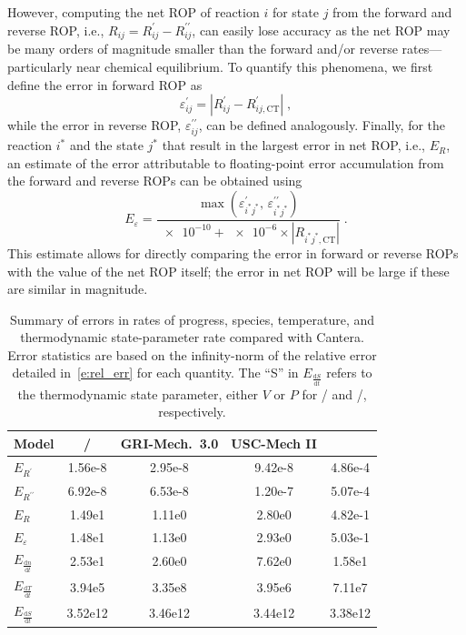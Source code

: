\documentclass[12pt,number,sort&compress,preprint]{elsarticle}
\begin{document}
However, computing the net ROP of reaction $i$ for state $j$ from the forward and reverse ROP, i.e., $R_{ij} = R_{ij}^{\prime} - R_{ij}^{\prime\prime}$, can easily lose accuracy as the net ROP may be many orders of magnitude smaller than the forward and\slash or reverse rates---particularly near chemical equilibrium.
To quantify this phenomena, we first define the error in forward ROP as
\begin{equation}
\varepsilon^{\prime}_{ij} = \left\lvert R_{ij}^{\prime} - R_{ij,\text{CT}}^{\prime} \right\rvert \;,
\end{equation}
while the error in reverse ROP, $\varepsilon^{\prime\prime}_{ij}$, can be defined analogously.
Finally, for the reaction $i^{*}$ and the state $j^{*}$ that result in the largest error in net ROP, i.e., $E_{R}$, an estimate of the error attributable to floating-point error accumulation from the forward and reverse ROPs can be obtained using
\begin{equation}
E_{\varepsilon} = \frac{\max(\varepsilon^{\prime}_{i^{*}j^{*}}\text{, }\varepsilon^{\prime\prime}_{i^{*}j^{*}})}{\num{e-10} + \num{e-6} \times \left\lvert R_{i^{*}j^{*},\text{CT}} \right\rvert} \;.
\end{equation}
This estimate allows for directly comparing the error in forward or reverse ROPs with the value of the net ROP itself; the error in net ROP will be large if these are similar in magnitude.

\begin{table}[htbp]
\centering
\begin{tabular}{@{}l S[table-format=1.2e1] S[table-format=1.2e1] S[table-format=1.2e1] S[table-format=1.2e1] @{}}
\toprule
{Model} & {\slash{}} & {GRI-Mech.~3.0} & {USC-Mech II} & {} \\
\midrule
$E_{R^{\prime}}$                    & 1.56e-8 & 2.95e-8 & 9.42e-8 & 4.86e-4 \\
$E_{R^{\prime\prime}}$              & 6.92e-8 & 6.53e-8 & 1.20e-7 & 5.07e-4 \\
$E_{R}$                             & 1.49e1  & 1.11e0  & 2.80e0  & 4.82e-1 \\
$E_{\varepsilon}$                   & 1.48e1  & 1.13e0  & 2.93e0  & 5.03e-1 \\
$E_{\frac{\text{d} n}{\text{d} t}}$ & 2.53e1  & 2.60e0  & 7.62e0  & 1.58e1 \\
$E_{\frac{\text{d} T}{\text{d} t}}$ & 3.94e5  & 3.35e8  & 3.95e6  & 7.11e7 \\
$E_{\frac{\text{d} S}{\text{d} t}}$ & 3.52e12 & 3.46e12 & 3.44e12 & 3.38e12 \\
\bottomrule
\end{tabular}
\caption{Summary of errors in rates of progress, species, temperature, and thermodynamic state-parameter rate compared with Cantera.
Error statistics are based on the infinity-norm of the relative error detailed in~\cref{e:rel_err} for each quantity.
The ``S'' in $E_{\frac{\text{d} S}{\text{d} t}}$ refers to the thermodynamic state parameter, either $V$ or $P$ for \conp/ and \conv/, respectively.
}
\label{T:source_error}
\end{table}
\end{document}
